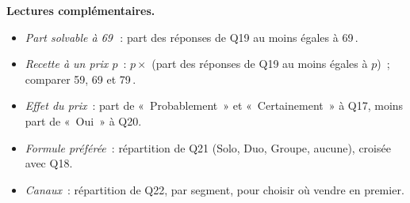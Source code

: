 \documentclass[11pt,a4paper]{article}
\begin{document}
\vspace{6pt}
\textbf{Lectures complémentaires.}
\begin{itemize}[nosep]
  \item \emph{Part solvable à 69\,\texteuro}~: part des réponses de Q19 au moins égales à 69\,\texteuro.
  \item \emph{Recette à un prix $p$}~: $p \times$ (part des réponses de Q19 au moins égales à $p$)~; comparer 59, 69 et 79\,\texteuro.
  \item \emph{Effet du prix}~: part de «~Probablement~» et «~Certainement~» à Q17, moins part de «~Oui~» à Q20.
  \item \emph{Formule préférée}~: répartition de Q21 (Solo, Duo, Groupe, aucune), croisée avec Q18.
  \item \emph{Canaux}~: répartition de Q22, par segment, pour choisir où vendre en premier.
\end{itemize}
\end{document}
